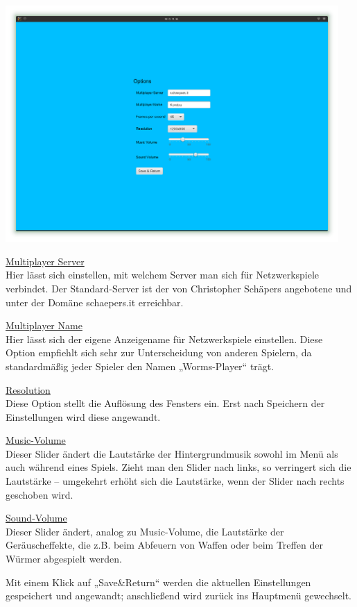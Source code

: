 \documentclass{scrreprt}
\begin{document}
\includegraphics[height=9cm]{Screenshot2.png}

\underline{Multiplayer Server}\\
Hier lässt sich einstellen, mit welchem Server man sich für Netzwerkspiele verbindet. Der Standard-Server ist der von
Christopher Schäpers angebotene und unter der Domäne schaepers.it erreichbar.

\underline{Multiplayer Name}\\
Hier lässt sich der eigene Anzeigename für Netzwerkspiele einstellen. Diese Option empfiehlt sich sehr zur Unterscheidung von anderen Spielern, da standardmäßig jeder Spieler den Namen „Worms-Player“ trägt.

\underline{Resolution}\\
Diese Option stellt die Auflösung des Fensters ein. Erst nach Speichern der Einstellungen wird diese angewandt.

\underline{Music-Volume}\\
Dieser Slider ändert die Lautstärke der Hintergrundmusik sowohl im Menü als auch während eines Spiels. Zieht man den Slider nach links, so verringert sich die Lautstärke – umgekehrt erhöht sich die Lautstärke, wenn der Slider nach rechts geschoben wird.

\underline{Sound-Volume}\\
Dieser Slider ändert, analog zu Music-Volume, die Lautstärke der Geräuscheffekte, die z.B. beim Abfeuern von Waffen oder beim Treffen
der Würmer abgespielt werden.

Mit einem Klick auf „Save&Return“ werden die aktuellen Einstellungen gespeichert und angewandt; anschließend wird zurück ins Hauptmenü gewechselt.
\end{document}
